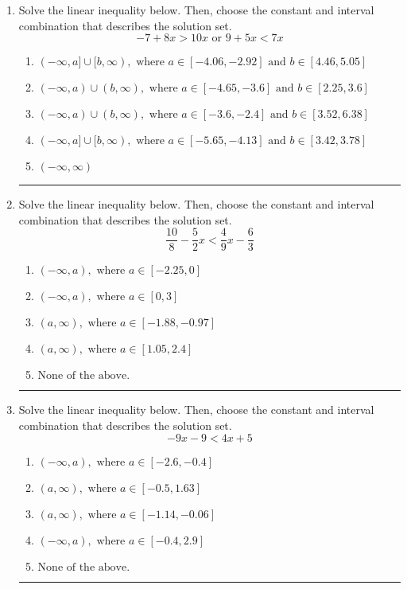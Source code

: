 \documentclass[14pt]{extbook}
\newcommand{\litem}[1]{\item#1\hspace*{-1cm}\rule{\textwidth}{0.4pt}}
\begin{document}
\begin{enumerate}
{\begin{enumerate}[label=\Alph*.]
\end{enumerate} }
\litem{
Solve the linear inequality below. Then, choose the constant and interval combination that describes the solution set.\[ -7 + 8 x > 10 x \text{ or } 9 + 5 x < 7 x \]\begin{enumerate}[label=\Alph*.]
\item \( (-\infty, a] \cup [b, \infty), \text{ where } a \in [-4.06, -2.92] \text{ and } b \in [4.46, 5.05] \)
\item \( (-\infty, a) \cup (b, \infty), \text{ where } a \in [-4.65, -3.6] \text{ and } b \in [2.25, 3.6] \)
\item \( (-\infty, a) \cup (b, \infty), \text{ where } a \in [-3.6, -2.4] \text{ and } b \in [3.52, 6.38] \)
\item \( (-\infty, a] \cup [b, \infty), \text{ where } a \in [-5.65, -4.13] \text{ and } b \in [3.42, 3.78] \)
\item \( (-\infty, \infty) \)

\end{enumerate} }
\litem{
Solve the linear inequality below. Then, choose the constant and interval combination that describes the solution set.\[ \frac{10}{8} - \frac{5}{2} x < \frac{4}{9} x - \frac{6}{3} \]\begin{enumerate}[label=\Alph*.]
\item \( (-\infty, a), \text{ where } a \in [-2.25, 0] \)
\item \( (-\infty, a), \text{ where } a \in [0, 3] \)
\item \( (a, \infty), \text{ where } a \in [-1.88, -0.97] \)
\item \( (a, \infty), \text{ where } a \in [1.05, 2.4] \)
\item \( \text{None of the above}. \)

\end{enumerate} }
\litem{
Solve the linear inequality below. Then, choose the constant and interval combination that describes the solution set.\[ -9x -9 < 4x + 5 \]\begin{enumerate}[label=\Alph*.]
\item \( (-\infty, a), \text{ where } a \in [-2.6, -0.4] \)
\item \( (a, \infty), \text{ where } a \in [-0.5, 1.63] \)
\item \( (a, \infty), \text{ where } a \in [-1.14, -0.06] \)
\item \( (-\infty, a), \text{ where } a \in [-0.4, 2.9] \)
\item \( \text{None of the above}. \)


\end{enumerate}}
\end{enumerate}
\end{document}
